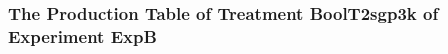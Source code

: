  \begin{frame}
 \fontsize{8pt}{9pt}\selectfont
 \frametitle{ The Production Table of Treatment BoolT2sgp3k of Experiment ExpB }

 \label{ExpBGrammarTable011.tex}  
 \end{frame}

